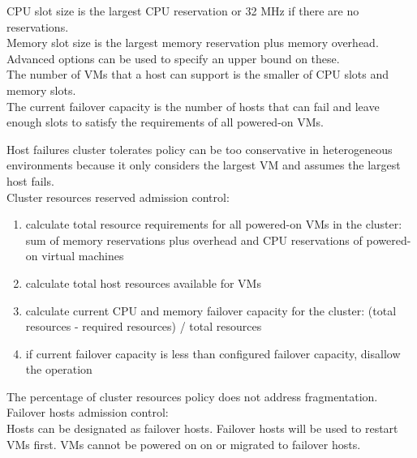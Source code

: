 CPU slot size is the largest CPU reservation or 32 MHz if there are no
reservations.\\

Memory slot size is the largest memory reservation plus memory overhead.\\

Advanced options can be used to specify an upper bound on these.\\

The number of VMs that a host can support is the smaller of CPU slots and
memory slots.\\

The current failover capacity is the number of hosts that can
fail and leave enough slots to satisfy the requirements of all powered-on
VMs.

Host failures cluster tolerates policy can be too conservative in
heterogeneous environments because it only considers the largest VM and assumes
the largest host fails.\\

Cluster resources reserved admission control:

\begin{enumerate}

\item calculate total resource requirements for all powered-on VMs in the
cluster: sum of memory reservations plus overhead and CPU reservations of
powered-on virtual machines

\item calculate total host resources available for VMs

\item calculate current CPU and memory failover capacity for the cluster:
(total resources - required resources) / total resources

\item if current failover capacity is less than configured failover capacity,
disallow the operation

\end{enumerate}

The percentage of cluster resources policy does not address fragmentation.\\

Failover hosts admission control:\\

Hosts can be designated as failover hosts. Failover hosts will be used to
restart VMs first. VMs cannot be powered on on or migrated to failover hosts.\\

